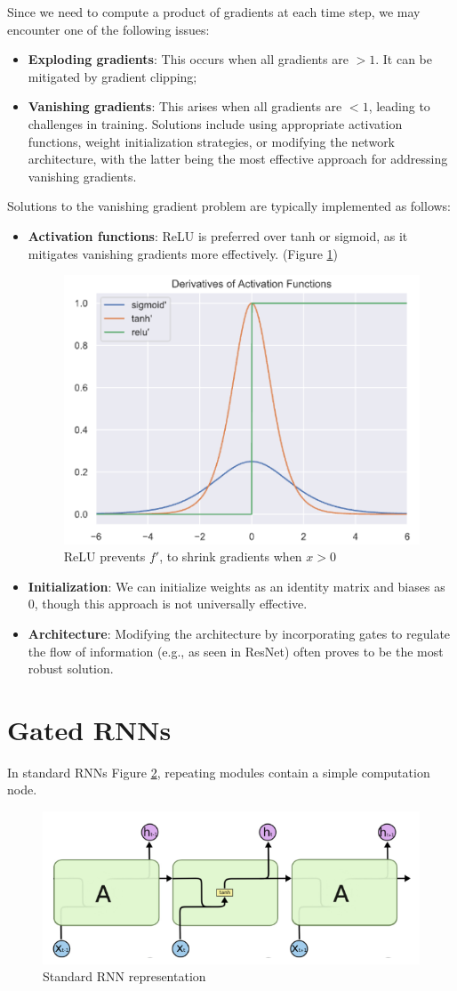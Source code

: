 Since we need to compute a product of gradients at each time step, we may encounter
one of the following issues:
\begin{itemize}
    \item \textbf{Exploding gradients}: This occurs when all gradients are $> 1$.
          It can be mitigated by gradient clipping;
    \item \textbf{Vanishing gradients}: This arises when all gradients are $< 1$,
          leading to challenges in training. Solutions include using appropriate
          activation functions, weight initialization strategies, or modifying
          the network architecture, with the latter being the most effective
          approach for addressing vanishing gradients.
\end{itemize}

Solutions to the vanishing gradient problem are typically implemented as follows:
\begin{itemize}
    \item \textbf{Activation functions}: ReLU is preferred over tanh or sigmoid,
          as it mitigates vanishing gradients more effectively. (Figure \ref{fig:activation})
          \begin{figure}[!ht]
              \centering
              \includegraphics[width=0.3\linewidth]{img/RNN/derivatives.png}
              \caption{ReLU prevents $f'$, to shrink gradients when $x > 0$}
              \label{fig:activation}
          \end{figure}
    \item \textbf{Initialization}: We can initialize weights as an identity matrix
          and biases as 0, though this approach is not universally effective.
    \item \textbf{Architecture}: Modifying the architecture by incorporating gates
          to regulate the flow of information (e.g., as seen in ResNet) often
          proves to be the most robust solution.
\end{itemize}
\section{Gated RNNs}
In standard RNNs Figure \ref{fig:sRNN}, repeating modules contain a simple
computation node.
\begin{figure}[!ht]
    \centering
    \includegraphics[width=0.5\linewidth]{img/RNN/sRNN.png}
    \caption{Standard RNN representation}
    \label{fig:sRNN}
\end{figure}

